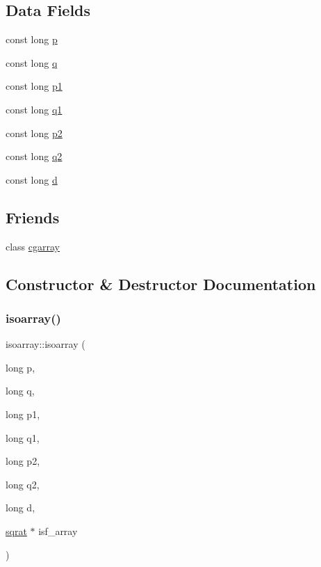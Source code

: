 \subsection*{Data Fields}
\begin{DoxyCompactItemize}
\item 
const long \mbox{\hyperlink{classisoarray_adeea7560653c9c61f9ec7ca78ec1a43d}{p}}
\item 
const long \mbox{\hyperlink{classisoarray_a6ba8b815c26280122084ee9754cfd868}{q}}
\item 
const long \mbox{\hyperlink{classisoarray_a44a74d2c637cd50b4016fb68f469d674}{p1}}
\item 
const long \mbox{\hyperlink{classisoarray_a49a8c7ad042720ba0f0251f838a81926}{q1}}
\item 
const long \mbox{\hyperlink{classisoarray_a2c7e4538fd56007f89979d0f1d19f4cf}{p2}}
\item 
const long \mbox{\hyperlink{classisoarray_a3d08dedb3a7b238fe7a088f8aa54db0b}{q2}}
\item 
const long \mbox{\hyperlink{classisoarray_af3715f50052bd54b3476e9831fe4d71b}{d}}
\end{DoxyCompactItemize}
\subsection*{Friends}
\begin{DoxyCompactItemize}
\item 
class \mbox{\hyperlink{classisoarray_a27c452d0372903eeb416af9256dacd0f}{cgarray}}
\end{DoxyCompactItemize}


\subsection{Constructor \& Destructor Documentation}
\mbox{\label{classisoarray_a2255ec3a14431cdc95ea8d0b0150fde6}} 
\subsubsection{\texorpdfstring{isoarray()}{isoarray()}\hspace{0.1cm}{\footnotesize\ttfamily [1/3]}}
{\footnotesize\ttfamily isoarray\+::isoarray (\begin{DoxyParamCaption}\item[{long}]{p,  }\item[{long}]{q,  }\item[{long}]{p1,  }\item[{long}]{q1,  }\item[{long}]{p2,  }\item[{long}]{q2,  }\item[{long}]{d,  }\item[{\mbox{\hyperlink{classsqrat}{sqrat}} $\ast$}]{isf\+\_\+array }\end{DoxyParamCaption})}

